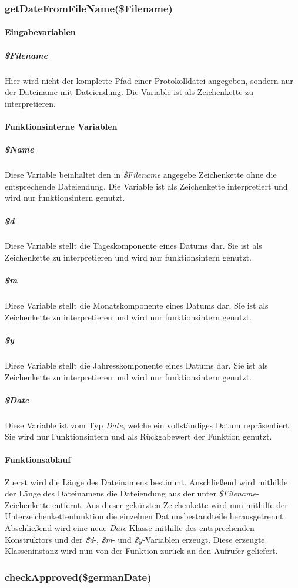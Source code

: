 \documentclass[12pt,parskip=full, pagea4]{scrreprt}
\begin{document}
	\subsubsection{getDateFromFileName(\$Filename)}
	\paragraph{Eingabevariablen}
	\subparagraph{\$Filename} Hier wird nicht der komplette Pfad einer Protokolldatei angegeben, sondern nur der Dateiname mit Dateiendung. Die Variable ist als Zeichenkette zu interpretieren.
	\paragraph{Funktionsinterne Variablen}
	\subparagraph{\$Name} Diese Variable beinhaltet den in \textit{\$Filename} angegebe Zeichenkette ohne die entsprechende Dateiendung. Die Variable ist als Zeichenkette interpretiert und wird nur funktionsintern genutzt.
	\subparagraph{\$d} Diese Variable stellt die Tageskomponente eines Datums dar. Sie ist als Zeichenkette zu interpretieren und wird nur funktionsintern genutzt.
	\subparagraph{\$m} Diese Variable stellt die Monatskomponente eines Datums dar. Sie ist als Zeichenkette zu interpretieren und wird nur funktionsintern genutzt.
	\subparagraph{\$y} Diese Variable stellt die Jahresskomponente eines Datums dar. Sie ist als Zeichenkette zu interpretieren und wird nur funktionsintern genutzt.
	\subparagraph{\$Date} Diese Variable ist vom Typ \textit{Date}, welche ein vollständiges Datum repräsentiert. Sie wird nur Funktionsintern und als Rückgabewert der Funktion genutzt.
	\paragraph{Funktionsablauf} Zuerst wird die Länge des Dateinamens bestimmt. Anschließend wird mithilde der Länge des Dateinamens die Dateiendung aus der unter \textit{\$Filename}-Zeichenkette entfernt. Aus dieser gekürzten Zeichenkette wird nun mithilfe der Unterzeichenkettenfunktion die einzelnen Datumsbestandteile herausgetrennt. Abschließend wird eine neue \textit{Date}-Klasse mithilfe des entsprechenden Konstruktors und der \textit{\$d}-, \textit{\$m}- und \textit{\$y}-Variablen erzeugt. Diese erzeugte Klasseninstanz wird nun von der Funktion zurück an den Aufrufer geliefert.
	
	\subsubsection{checkApproved(\$germanDate)}
	
\end{document}
